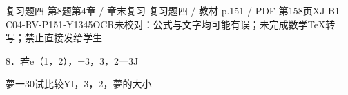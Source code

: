 \begin{bankitem}{复习题四 第8题}{第4章 / 章末复习 复习题四 / 教材 p.151 / PDF 第158页}{XJ-B1-C04-RV-P151-Y1345}{OCR未校对：公式与文字均可能有误；未完成数学TeX转写；禁止直接发给学生}
\begin{ocrdraft}
\par
8．若e（1，2），=3，3，2一3J
\par
夢一30试比较YI，3，2，夢的大小
\end{ocrdraft}
\end{bankitem}
